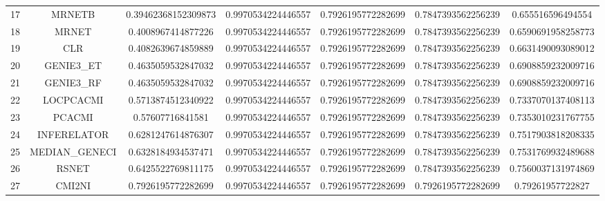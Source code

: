 \documentclass[a4paper,10pt]{article}
\begin{document}
\begin{landscape}
\begin{table}[!htp]
\begin{tabular}{ccccccc}
17&MRNETB&0.39462368152309873&0.9970534224446557&0.7926195772282699&0.7847393562256239&0.655516596494554\\
18&MRNET&0.4008967414877226&0.9970534224446557&0.7926195772282699&0.7847393562256239&0.6590691958258773\\
19&CLR&0.4082639674859889&0.9970534224446557&0.7926195772282699&0.7847393562256239&0.6631490093089012\\
20&GENIE3_ET&0.4635059532847032&0.9970534224446557&0.7926195772282699&0.7847393562256239&0.6908859232009716\\
21&GENIE3_RF&0.4635059532847032&0.9970534224446557&0.7926195772282699&0.7847393562256239&0.6908859232009716\\
22&LOCPCACMI&0.5713874512340922&0.9970534224446557&0.7926195772282699&0.7847393562256239&0.7337070137408113\\
23&PCACMI&0.57607716841581&0.9970534224446557&0.7926195772282699&0.7847393562256239&0.7353010231767755\\
24&INFERELATOR&0.6281247614876307&0.9970534224446557&0.7926195772282699&0.7847393562256239&0.7517903818208335\\
25&MEDIAN_GENECI&0.6328184934537471&0.9970534224446557&0.7926195772282699&0.7847393562256239&0.7531769932489688\\
26&RSNET&0.6425522769811175&0.9970534224446557&0.7926195772282699&0.7847393562256239&0.7560037131974869\\
27&CMI2NI&0.7926195772282699&0.9970534224446557&0.7926195772282699&0.7926195772282699&0.79261957722827\\
\hline
\end{tabular}
\end{table}

\end{landscape}
\end{document}

